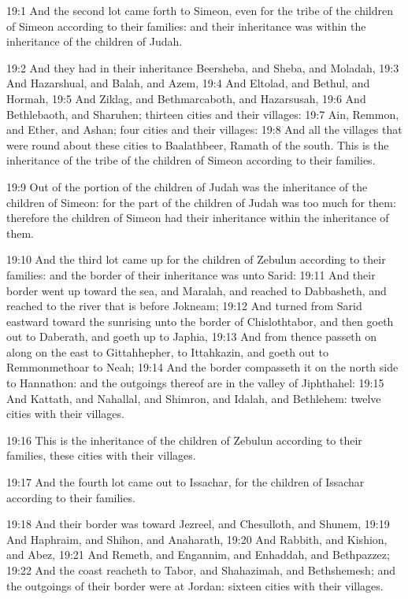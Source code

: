 19:1 And the second lot came forth to Simeon, even for the tribe of
the children of Simeon according to their families: and their
inheritance was within the inheritance of the children of Judah.

19:2 And they had in their inheritance Beersheba, and Sheba, and
Moladah, 19:3 And Hazarshual, and Balah, and Azem, 19:4 And Eltolad,
and Bethul, and Hormah, 19:5 And Ziklag, and Bethmarcaboth, and
Hazarsusah, 19:6 And Bethlebaoth, and Sharuhen; thirteen cities and
their villages: 19:7 Ain, Remmon, and Ether, and Ashan; four cities
and their villages: 19:8 And all the villages that were round about
these cities to Baalathbeer, Ramath of the south. This is the
inheritance of the tribe of the children of Simeon according to their
families.

19:9 Out of the portion of the children of Judah was the inheritance
of the children of Simeon: for the part of the children of Judah was
too much for them: therefore the children of Simeon had their
inheritance within the inheritance of them.

19:10 And the third lot came up for the children of Zebulun according
to their families: and the border of their inheritance was unto Sarid:
19:11 And their border went up toward the sea, and Maralah, and
reached to Dabbasheth, and reached to the river that is before
Jokneam; 19:12 And turned from Sarid eastward toward the sunrising
unto the border of Chislothtabor, and then goeth out to Daberath, and
goeth up to Japhia, 19:13 And from thence passeth on along on the east
to Gittahhepher, to Ittahkazin, and goeth out to Remmonmethoar to
Neah; 19:14 And the border compasseth it on the north side to
Hannathon: and the outgoings thereof are in the valley of Jiphthahel:
19:15 And Kattath, and Nahallal, and Shimron, and Idalah, and
Bethlehem: twelve cities with their villages.

19:16 This is the inheritance of the children of Zebulun according to
their families, these cities with their villages.

19:17 And the fourth lot came out to Issachar, for the children of
Issachar according to their families.

19:18 And their border was toward Jezreel, and Chesulloth, and Shunem,
19:19 And Haphraim, and Shihon, and Anaharath, 19:20 And Rabbith, and
Kishion, and Abez, 19:21 And Remeth, and Engannim, and Enhaddah, and
Bethpazzez; 19:22 And the coast reacheth to Tabor, and Shahazimah, and
Bethshemesh; and the outgoings of their border were at Jordan: sixteen
cities with their villages.

